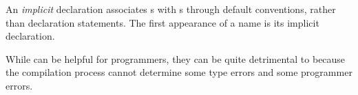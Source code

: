 \begin{definition}[Implicit]\label{def:Implicit_Static_Variable_Type_Binding}
  An \emph{implicit}    declaration associates s with s through default conventions, rather than  declaration statements.
  The first appearance of a  name is its implicit declaration.

  \begin{remark}
    While  can be helpful for programmers, they can be quite detrimental to  because the compilation process cannot determine some type errors and some programmer errors.
  \end{remark}
\end{definition}

